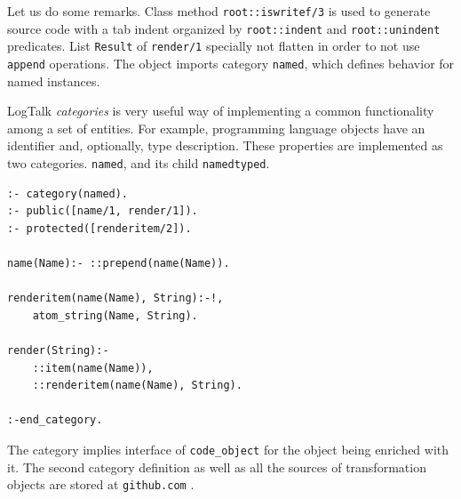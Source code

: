 \documentclass[conference]{IEEEtran}
\begin{document}
Let us do some remarks.  Class method \verb|root::iswritef/3| is used to generate source code with a tab indent organized by \verb|root::indent| and \verb|root::unindent| predicates.  List \verb|Result| of \verb|render/1| specially not flatten in order to not use \verb|append| operations.  The object imports category \verb|named|, which defines behavior for named instances.


LogTalk \emph{categories} is very useful way of implementing a common functionality among a set of entities.  For example, programming language objects have an identifier and, optionally, type description.  These properties are implemented as two categories.
\texttt{named}, and its child \texttt{namedtyped}.
\begin{verbatim}
:- category(named).
:- public([name/1, render/1]).
:- protected([renderitem/2]).

name(Name):- ::prepend(name(Name)).

renderitem(name(Name), String):-!,
    atom_string(Name, String).

render(String):-
    ::item(name(Name)),
    ::renderitem(name(Name), String).

:-end_category.
\end{verbatim}

The category implies interface of \texttt{code\_object} for the object being enriched with it.  The second category definition as well as all the sources of transformation objects are stored at \texttt{github.com} \cite{ghsrc}.  %




\end{document}
